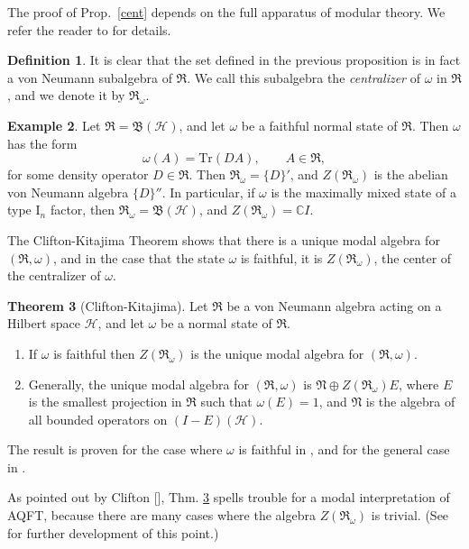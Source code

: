 \documentclass[11pt]{article}
\newcommand{\alg}[1]{\mathfrak{#1}}
\newcommand{\bh}{\mathfrak{B}(\mathcal{H})}
\theoremstyle{definition}
\newtheorem{thm}{Theorem}[section]
\theoremstyle{definition}
\newtheorem{defn}[thm]{Definition}
\newtheorem{example}[thm]{Example}
\theoremstyle{remark}
\def\2#1{{\mathcal #1}}
\def\7#1{{\mathbb #1}}
\def\al#1{{\mathfrak #1}}
\def\om{\omega} \def\Om{\Omega} \def\dd{\partial} \def\D{\Delta}
\newcommand{\tr}{\mathrm{Tr}}
\begin{document}
The proof of Prop.\ \ref{cent} depends on the full apparatus of
modular theory.  We refer the reader to \cite[Chap. 8]{tak2} for
details.

\begin{defn} It is clear that the set defined in the previous
  proposition is in fact a von Neumann subalgebra of $\alg{R}$.  We
  call this subalgebra the \emph{centralizer} of $\om$ in $\alg{R}$,
  and we denote it by $\al R_\om$.
\end{defn}

\begin{example} Let $\al R=\bh$, and let $\om$ be a faithful normal
  state of $\al R$.  Then $\om$ has the form
$$ \om (A)=\tr
(DA),\qquad A\in \al R ,$$ for some density operator $D\in \al R$.
Then $\al R_\om = \{ D\}'$, and $Z(\al R_\om )$ is the abelian von
Neumann algebra $\{ D\}''$.  In particular, if $\om$ is the maximally
mixed state of a type I$_n$ factor, then $\al R_\om =\bh$, and $Z(\al
R_\om )=\7C I$.
\end{example}

The Clifton-Kitajima Theorem shows that there is a unique modal
algebra for $(\alg{R},\om )$, and in the case that the state $\om$ is
faithful, it is $Z(\al R_\om )$, the center of the centralizer of
$\om$.

\begin{thm}[Clifton-Kitajima] Let $\alg{R}$ be a von Neumann algebra
  acting on a Hilbert space $\2H$, and let $\om$ be a normal state of
  $\alg{R}$.
  \begin{enumerate} \item If $\om$ is faithful then $Z(\al R_\om )$ is
    the unique modal algebra for $(\alg{R} ,\om )$.
  \item Generally, the unique modal algebra for $(\alg{R},\om )$ is
    $\alg{N}\oplus Z(\al R_\om )E$, where $E$ is the smallest
    projection in $\al R$ such that $\om (E)=1$, and $\al N$ is the
    algebra of all bounded operators on $(I-E)(\2H)$.
  \end{enumerate}
  \label{kitty}
\end{thm}

\noindent The result is proven for the case where $\om$ is faithful in
\cite{cli9}, and for the general case in \cite{kit}.

As pointed out by Clifton [\citeyear{cli9}], Thm. \ref{kitty} spells
trouble for a modal interpretation of AQFT, because there are many
cases where the algebra $Z(\al R_\om )$ is trivial.  (See
\cite{rue-ear} for further development of this point.)
\end{document}
